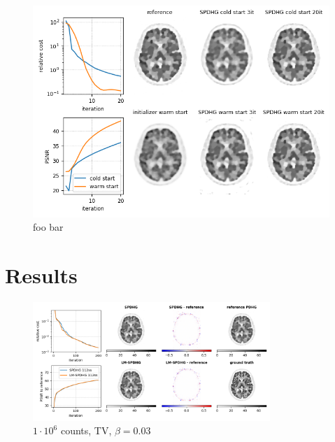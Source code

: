\begin{figure}
  \centering
    \includegraphics[width=1.0\columnwidth]{figs/SPDHG_cold_vs_warm_start.png}
  \caption{foo bar}
\end{figure}


\section{Results}

\begin{figure}
  \centering
    \includegraphics[width=0.8\textwidth]{./figs/brain2d_counts_1.0E+06_seed_1_beta_3.0E-02_prior_TV_niter_ref_20000_fwhm_4.5_4.5_niter_200.png}
  \caption{$1\cdot10^6$ counts, TV, $\beta = 0.03$}
\end{figure}





